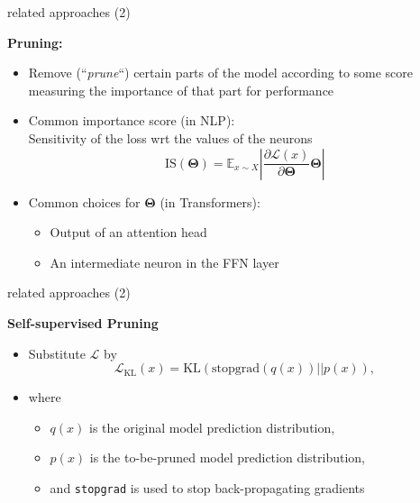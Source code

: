 
\begin{frame}{related approaches (2)}

\vfill

\textbf{Pruning:}

\begin{itemize}
	\item Remove (``\textit{prune}``) certain parts of the model according to some score measuring the importance of that part for performance 
	\item Common importance score (in NLP):\\Sensitivity of the loss wrt the values of the neurons 
							$$\mathrm{IS}(\bm\Theta) = \mathbb{E}_{x\sim X}\left\lvert \frac{\partial \mathcal{L}(x)}{\partial\bm\Theta}\bm\Theta \right\rvert$$
	\item Common choices for $\bm\Theta$ (in Transformers):
			\begin{itemize}
				\item Output of an attention head
				\item An intermediate neuron in the FFN layer
			\end{itemize}
\end{itemize}

\vfill
	
\end{frame}


\begin{frame}{related approaches (2)}

\vfill

\textbf{Self-supervised Pruning} 

\begin{itemize}
	\item Substitute $\mathcal{L}$ by
							$$\mathcal{L}_{\mathrm{KL}}(x)=\mathrm{KL}(\mathrm{stopgrad}(q(x))||p(x)),$$
	\item where
			\begin{itemize}
				\item $q(x)$ is the original model prediction distribution,
				\item $p(x)$ is the to-be-pruned model prediction distribution,
				\item and \texttt{stopgrad} is used to stop back-propagating gradients
			\end{itemize}
\end{itemize}

\vfill
	
\end{frame}

